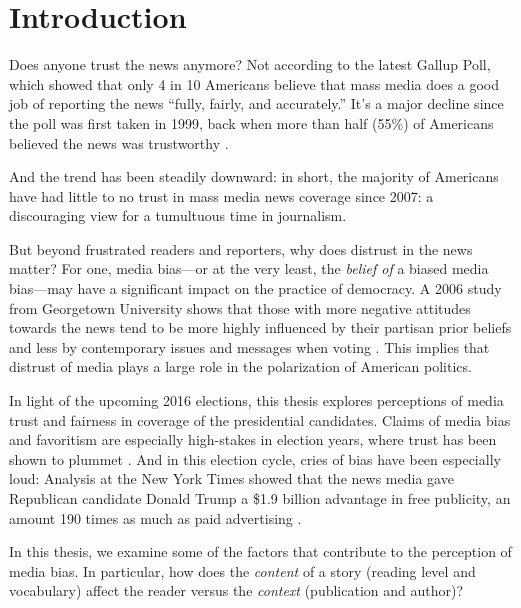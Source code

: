 
\chapter{Introduction} 

Does anyone trust the news anymore? Not according to the latest Gallup Poll, which showed that only 4 in 10 Americans believe that mass media does a good job of reporting the news ``fully, fairly, and accurately.'' It's a major decline since the poll was first taken in 1999, back when more than half (55\%) of Americans believed the news was trustworthy \cite{Gallup-trust-2015}.

And the trend has been steadily downward: in short, the majority of Americans have had little to no trust in mass media news coverage since 2007: a discouraging view for a tumultuous time in journalism.

But beyond frustrated readers and reporters, why does distrust in the news matter? For one, media bias---or at the very least, the \emph{belief of} a biased media bias---may have a significant impact on the practice of democracy. A 2006 study from Georgetown University shows that those with more negative attitudes towards the news tend to be more highly influenced by their partisan prior beliefs and less by contemporary issues and messages when voting \cite{ladd2005attitudes}. This implies that distrust of media plays a large role in the polarization of American politics.

In light of the upcoming 2016 elections, this thesis explores perceptions of media trust and fairness in coverage of the presidential candidates. Claims of media bias and favoritism are especially high-stakes in election years, where trust has been shown to plummet \cite{Gallup-trust-2015}. And in this election cycle, cries of bias have been especially loud: Analysis at the New York Times showed that the news media gave Republican candidate Donald Trump a \$1.9 billion advantage in free publicity, an amount 190 times as much as paid advertising \cite{Trump-advantage}.

In this thesis, we examine some of the factors that contribute to the perception of media bias. In particular, how does the \emph{content} of a story (reading level and vocabulary) affect the reader versus the \emph{context} (publication and author)? 

